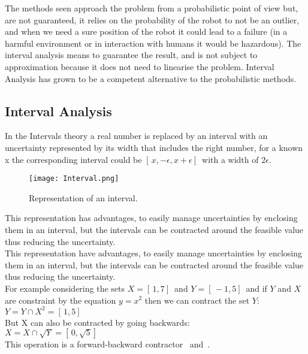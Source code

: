 The methods seen approach the problem from a probabilistic point of view but, are not guaranteed, it relies on the probability of the robot to not be an outlier, and when we need a sure position of the robot it could lead to a failure (in a harmful environment or in interaction with humans it would be hazardous). The interval analysis means to guarantee the result, and is not subject to approximation because it does not need to linearise the problem. Interval Analysis has grown to be a competent alternative to the probabilistic methods.

\subsection{Interval Analysis}
\label{sec:srIA}
In the Intervals theory a real number is replaced by an interval with an uncertainty represented by its width that includes the right number, for a known x the corresponding interval could be $[ \,x,-\epsilon,x+\epsilon] \,$ with a width of $2\epsilon$.

\begin{figure}[H]
\centering
    \texttt{[image: Interval.png]} 
    \caption{Representation of an interval.}
    \label{fig:interExample}
\end{figure}

This representation has advantages, to easily manage uncertainties by enclosing them in an interval, but the intervals can be contracted around the feasible value thus reducing the uncertainty.\\

This representation have advantages, to easily manage uncertainties by enclosing them in an interval, but the intervals can be contracted around the feasible value thus reducing the uncertainty.\\
For example considering the sets $X=[\,1,7]\,$ and $Y=[\,-1,5]\,$ and if $Y$ and $X$ are constraint by the equation $y=x^{2}$ then we can contract the set $Y$:\\

$Y = Y\cap X^{2} =[\,1,5]\,$\\

But X can also be contracted by going backwards:\\

$X=X\cap \sqrt{Y} =[\,0,\sqrt{5}]\,$\\

This operation is a forward-backward contractor~\cite{jaulin2001applied} and~\cite{chabert2009contractor}.

